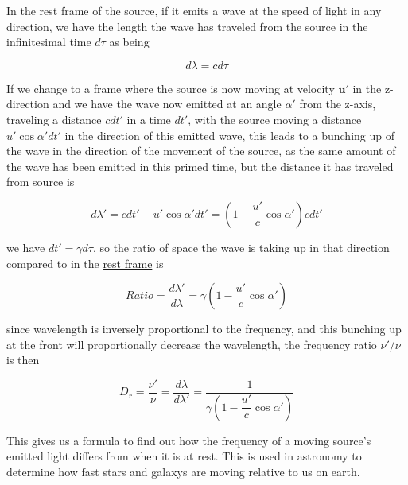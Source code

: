 In the rest frame of the source, if it emits a wave at the speed of light in any direction, we have the length the wave has traveled from the source in the infinitesimal time ${d\tau}$ as being

\begin{equation}
	{d\lambda} = {c}{d\tau}
\end{equation}

If we change to a frame where the source is now moving at velocity ${\mathbf{u}{'}}$ in the z-direction and we have the wave now emitted at an angle $\alpha{'}$ from the z-axis, traveling a distance ${c}{dt{'}}$ in a time ${dt{'}}$, with the source moving a distance $ u{'} \cos\alpha{'} {dt{'}}$ in the direction of this emitted wave, this leads to a bunching up of the wave in the direction of the movement of the source, as the same amount of the wave has been emitted in this primed time, but the distance it has traveled from source is

\begin{equation}
	{d\lambda{'}} = {c}{dt{'}}-{u}{'} \cos\alpha{'} {dt{'}} = (1-\frac{u{'}}{c}\cos\alpha{'})cdt{'}
\end{equation}

we have ${dt{'}} = {\gamma} {d\tau}$, so the ratio of space the wave is taking up in that direction compared to in the \hyperlink{def-proper-frame}{rest frame} is

\begin{equation}
	Ratio = \frac{d\lambda{'}}{d\lambda} = {\gamma} \left(1-\dfrac{u{'}}{c} \cos\alpha{'} \right)
\end{equation}

since wavelength is inversely proportional to the frequency, and this bunching up at the front will proportionally decrease the wavelength, the frequency ratio $\nu{'}/\nu$ is then

\begin{equation}
	\label{eq: Doppler Effect}
	D_{r} = \frac{\nu{'}}{\nu} = \frac{d\lambda}{d\lambda{'}} = \frac{1}{ {\gamma} \left(1-\dfrac{u{'}}{c} \cos\alpha{'} \right)}
\end{equation}

This gives us a formula to find out how the frequency of a moving source's emitted light differs from when it is at rest.
This is used in astronomy to determine how fast stars and galaxys are moving relative to us on earth.


